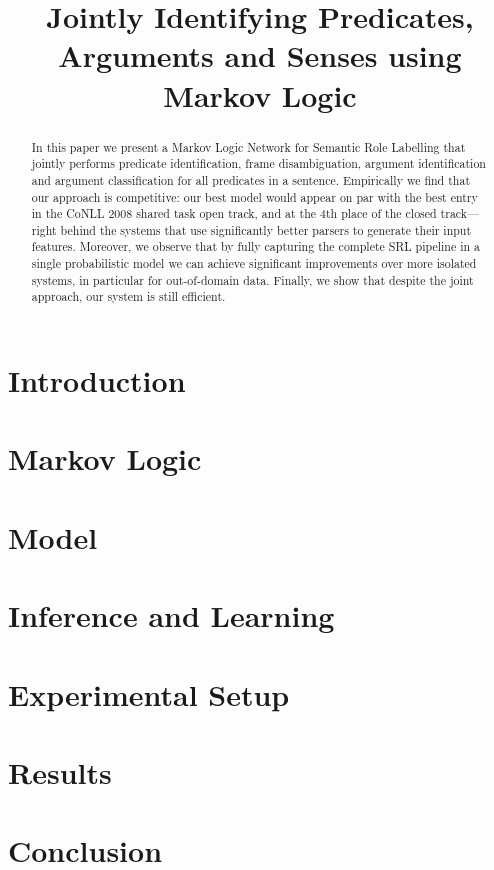 \documentclass[11pt]{article}
\title{Jointly Identifying Predicates, Arguments and Senses using Markov Logic}
\author{}
\date{}
\begin{document}



\maketitle
\begin{abstract}
In this paper we present a Markov Logic Network for Semantic Role
Labelling that jointly performs predicate identification, frame
disambiguation, argument identification and argument classification
for all predicates in a sentence. Empirically we find that our
approach is competitive: our best model would appear on par
with the best entry in the CoNLL 2008 shared task open track, and at
the 4th place of the closed track---right behind the systems that use
significantly better parsers to generate their input features.
Moreover, we observe
that by fully capturing the complete SRL pipeline in a single
probabilistic model we can achieve significant improvements over more isolated systems, in particular for out-of-domain
data. Finally, we show that despite the joint approach, our
system is still efficient. 
\end{abstract}

\section{Introduction}





\section{Markov Logic} \label{sec:markovlogic}



\section{Model} \label{sec:model} 



\section{Inference and Learning}\label{sec:inference}




\section{Experimental Setup}
\label{sec:experiments}


\section{Results}\label{sec:results}



\section{Conclusion} \label{sec:conclusion}





\end{document}
